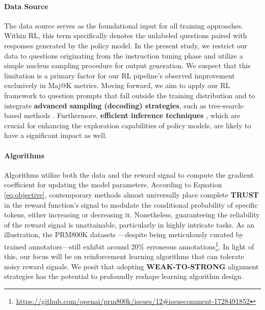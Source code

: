 \begin{itemize}[topsep=0pt]
\begin{itemize}[topsep=0pt]
\paragraph{Data Source} The data source serves as the foundational input for all training approaches. Within RL, this term specifically denotes the unlabeled questions paired with responses generated by the policy model. In the present study, we restrict our data to questions originating from the instruction tuning phase and utilize a simple nucleus sampling procedure for output generation. We suspect that this limitation is a primary factor for our RL pipeline’s observed improvement exclusively in Maj@K metrics. Moving forward, we aim to apply our RL framework to question prompts that fall outside the training distribution and to integrate \textbf{advanced sampling (decoding) strategies}, such as tree-search-based methods \citep{yao2023tree}. Furthermore, \textbf{efficient inference techniques} \citep{xia-etal-2023-speculative,leviathan2023fast,kwon2023efficient,xia2024unlocking}, which are crucial for enhancing the exploration capabilities of policy models, are likely to have a significant impact as well.

\paragraph{Algorithms} Algorithms utilize both the data and the reward signal to compute the gradient coefficient for updating the model parameters. According to Equation \ref{eq:objective}, contemporary methods almost universally place complete \textbf{TRUST} in the reward function's signal to modulate the conditional probability of specific tokens, either increasing or decreasing it. Nonetheless, guaranteeing the reliability of the reward signal is unattainable, particularly in highly intricate tasks. As an illustration, the PRM800K datasets \citep{lightman2023let}—despite being meticulously curated by trained annotators—still exhibit around 20\% erroneous annotations\footnote{\url{https://github.com/openai/prm800k/issues/12\#issuecomment-1728491852}}. In light of this, our focus will be on reinforcement learning algorithms that can tolerate noisy reward signals. We posit that adopting \textbf{WEAK-TO-STRONG} \citep{burns2023weak} alignment strategies has the potential to profoundly reshape learning algorithm design.


\end{itemize}
\end{itemize}
